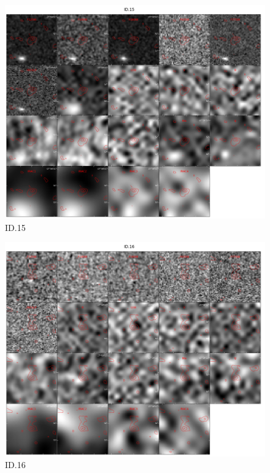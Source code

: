\begin{figure}[tbp]
\centering \includegraphics[width=160mm]{Matched/ASPECS_Cutout_14.jpg}
\caption{ID.15}
\label{fig:Match_Three}
\end{figure}

\begin{figure}[tbp]
\centering \includegraphics[width=160mm]{Matched/ASPECS_Cutout_15.jpg}
\caption{ID.16}
\label{fig:Match_Three}
\end{figure}

